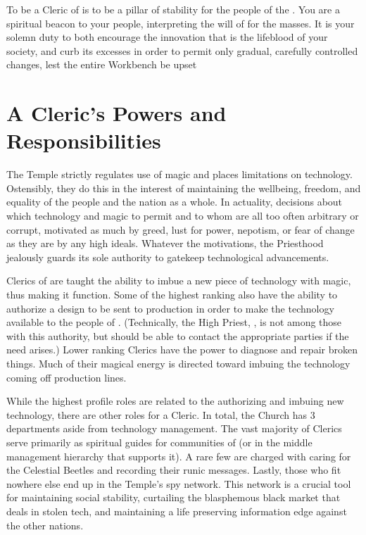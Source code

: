 \documentclass[blue]{GL2020}
\begin{document}
\name{\bFPFCleric{}}

To be a Cleric of \cTechGod{} is to be a pillar of stability for the people of the \pTech{}. You are a spiritual beacon to your people, interpreting the will of \cTechGod{} for the masses. It is your solemn duty to both encourage the innovation that is the lifeblood of your society, and curb its excesses in order to permit only gradual, carefully controlled changes, lest the entire Workbench be upset  

\section*{A Cleric's Powers and Responsibilities}
The Temple strictly regulates use of magic and places limitations on technology. Ostensibly, they do this in the interest of maintaining the wellbeing, freedom, and equality of the people and the nation as a whole. In actuality, decisions about which technology and magic to permit and to whom are all too often arbitrary or corrupt, motivated as much by greed, lust for power, nepotism, or fear of change as they are by any high ideals. Whatever the motivations, the Priesthood jealously guards its sole authority to gatekeep technological advancements.

Clerics of \cTechGod{} are taught the ability to imbue a new piece of technology with magic, thus making it function. Some of the highest ranking also have the ability to authorize a design to be sent to production in order to make the technology available to the people of \pTech{}. (Technically, the High Priest, \cAntiChup{}, is not among those with this authority, but \cAntiChup{\they} should be able to contact the appropriate parties if the need arises.) Lower ranking Clerics have the power to diagnose and repair broken things. Much of their magical energy is directed toward imbuing the technology coming off production lines.

While the highest profile roles are related to the authorizing and imbuing new technology, there are other roles for a Cleric. In total, the Church has 3 departments aside from technology management. The vast majority of Clerics serve primarily as spiritual guides for communities of \pTechies{} (or in the middle management hierarchy that supports it). A rare few are charged with caring for the Celestial Beetles and recording their runic messages. Lastly, those who fit nowhere else end up in the Temple’s spy network. This network is a crucial tool for maintaining social stability, curtailing the blasphemous black market that deals in stolen tech, and maintaining a life preserving information edge against the other nations.
\end{document}
